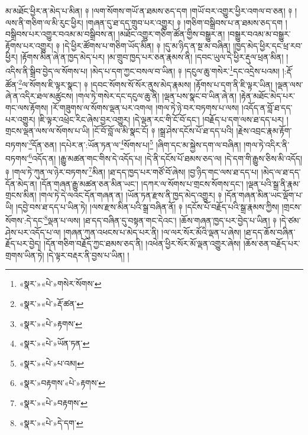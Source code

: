 མ་མཐོང་ཕྱིར་ན་མེད་པ་མིན། ༈ །ལག་སོགས་གཡོ་ན་ཐམས་ཅད་དག །གཡོ་བར་འགྱུར་ཕྱིར་འགལ་བ་ཅན། ༈ །ལས་ནི་གཅིག་ལ་མི་རུང་ཕྱིར། །གཞན་དུ་ཐ་དད་གྲུབ་པར་འགྱུར། ༈ །གཅིག་བསྒྲིབས་པ་ན་ཐམས་ཅད་དག །བསྒྲིབས་པར་འགྱུར་བའམ་མ་བསྒྲིབས་ན། །མཐོང་འགྱུར་གཅིག་ཚོན་གྱིས་བསྒྱུར་ན། །བསྒྱུར་བའམ་མ་བསྒྱུར་རྟོགས་པར་འགྱུར། ༈ །དེ་ཕྱིར་ཚོགས་པ་གཅིག་ཡོད་མིན། ༈ །དུ་མ་ཉིད་ན་སྔ་མ་བཞིན། །ཁྱད་མེད་ཕྱིར་དང་ཕྲ་རབ་ཕྱིར། །རྟོགས་མིན་ཞེ་ན་ཁྱད་མེད་པར། །མ་གྲུབ་ཁྱད་པར་ཅན་རྣམས་ནི། །དབང་ཡུལ་དེ་ཕྱིར་རྡུལ་ཕྲན་མིན། །འདིས་ནི་སྒྲིབ་བྱེད་ལ་སོགས་པ། །མེད་པ་དག་ཀྱང་བསལ་བ་ཡིན། ༈ །དངུལ་ཆུ་གསེར་\footnote{«སྣར་»«པེ་»གསེར་སོགས་}དང་འདྲེས་པའམ། །:རྡོ་ཚོན་\footnote{«སྣར་»«པེ་»རྡོ་ཚན་}ལ་སོགས་ཇི་ལྟར་སྣང་། ༈ །དབང་སོགས་སོ་སོར་ནུས་མེད་རྣམས། །རྟོགས་པ་དག་ནི་ཇི་ལྟར་ཡིན། །ལྡན་ལས་ཞེ་ན་འདིར་ཐལ་མཚུངས། །གལ་ཏེ་གསེར་དང་དངུལ་ཆུ་ནི། །ལྡན་པས་སྣང་བ་ཡིན་ཞེ་ན། །རྟེན་མཐོང་མེད་པར་གང་ལས་རྟོགས། །རོ་གཟུགས་ལ་སོགས་ལྡན་པར་འགལ། །གལ་ཏེ་ཉེ་བར་བཏགས་པ་ལས། །འདོད་ན་བློ་ཐ་དད་པར་འགྱུར། །ཇི་ལྟར་འཕྲེང་རིང་ཞེས་བྱར་འགྱུར། །དེ་ལྡན་རང་གི་ངོ་བོ་དང་། །བརྗོད་པ་དག་ལས་ཐ་དད་པར། །གྲངས་ལྡན་ལས་ལ་སོགས་པ་ཡི། །ངོ་བོ་བློ་ལ་མི་སྣང་ངོ། ༈ །སྒྲ་ཤེས་དངོས་པོ་ཐ་དད་པའི། །རྗེས་འབྲང་རྣམ་རྟོག་བཏགས་\footnote{«སྣར་»«པེ་»རྟགས་}དོན་ཅན། །དཔེར་ན་:ཡོན་ཏན་ལ་\footnote{«སྣར་»«པེ་»ཡོན་ཏན་}སོགས་པ།\footnote{«སྣར་»«པེ་»པ་འམ།} །ཞིག་དང་མ་སྐྱེས་དག་ལ་བཞིན། །གལ་ཏེ་འདིར་ནི་བཏགས་\footnote{«སྣར་»བརྟགས་«པེ་»རྟགས་}འདོད་ན། །རྒྱུ་མཚན་གང་གིས་དེ་འདོད་པ། །དེ་ནི་དངོས་པོ་ཐམས་ཅད་ལ། །དེ་དག་གི་རྒྱུས་ཅིས་མི་འདོད། ༈ །གལ་ཏེ་ཀུན་ལ་ཉེར་བཏགས་\footnote{«སྣར་»«པེ་»བརྟགས་}མིན། །ཐ་དད་ཁྱད་པར་གཙོ་བོ་ཞེས། །བྱ་ཉིད་གང་ལས་ཐ་དད་པ། །མེད་ལ་ཐ་དད་དོན་མེད་ན། །དོན་གཞན་རྒྱུ་མཚན་ཅན་མིན་ཡང་། །དཀར་ལ་སོགས་པ་གྲངས་སོགས་དང་། །ལྡན་པའི་སྒྲ་ནི་རྣམ་གྲངས་མིན། །གལ་ཏེ་དེ་ལའང་དོན་གཞན་ན། །ཡོན་ཏན་རྫས་ནི་ཁྱད་མེད་འགྱུར། ༈ །དོན་གཞན་མིན་ཡང་ལྡོག་པ་ཡི། །དབྱེ་བས་ཐ་དད་པ་ཡིན་ཏེ། །ལས་རྫས་མིན་པའི་སྒྲ་བཞིན་ནོ། ༈ །དངོས་པོ་བརྗོད་པའི་སྒྲ་རྣམས་ཀྱིས། །གྲངས་སོགས་:དེ་དང་\footnote{«སྣར་»«པེ་»དེ་དག་}ལྡན་པ་ལས། །ཐ་དད་བཞིན་དུ་བསྟན་གང་དེའང་། །ཆོས་གཞན་ཁྱད་པར་བྱེད་པ་ཡིན། ༈ །དེ་ཙམ་ཤེས་པར་འདོད་པ་ལ། །གཞན་ཀུན་འཕངས་པ་མེད་པར་ནི། །ལ་ལར་སོར་མོའི་ལྡན་པ་ཞེས། །ཐ་དད་ཆོས་བཞིན་རྗོད་པར་བྱེད། །དོན་གཅིག་བརྗོད་ཀྱང་ཐམས་ཅད་ནི། །འཕེན་ཕྱིར་སོར་མོ་ལྡན་འགྱུར་ཞེས། །ཆོས་ཅན་བརྗོད་པར་གྲགས་ཡིན་ཏེ། །དེ་ལྟར་བརྡར་ནི་བྱས་པ་ཡིན། །
